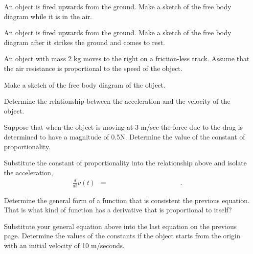 \begin{problem}
\item An object is fired upwards from the ground. Make a sketch of the
  free body diagram while it is in the air.
  \vfill

\item An object is fired upwards from the ground. Make a sketch of the
  free body diagram after it strikes the ground and comes to rest.
  \vfill

\end{problem}


\begin{problem}
\item An object with mass 2 kg moves to the right on a friction-less
  track. Assume that the air resistance is proportional to the speed
  of the object.

  \begin{subproblem}
  \item Make a sketch of the free body diagram of the object.
    \vfill
  \item Determine the relationship between the acceleration and the
    velocity of the object.
    \vfill
  \item Suppose that when the object is moving at 3 m/sec the force
    due to the drag is determined to have a magnitude of
    0.5N. Determine the value of the constant of proportionality.
    \vfill
  \item Substitute the constant of proportionality into the
    relationship above and isolate the acceleration,
    \begin{eqnarray*}
      \frac{d}{dt} v(t) & = & \hspace{10em}.
    \end{eqnarray*}
  \end{subproblem}

\clearpage

\item Determine the general form of a function that is consistent the
  previous equation. That is what kind of function has a derivative
  that is proportional to itself? 

  \vfill

\item Substitute your general equation above into the last equation on
  the previous page. Determine the values of the constants if the
  object starts from the origin with an initial velocity of 10
  m/seconds.

  \vfill

\clearpage

\end{problem}

